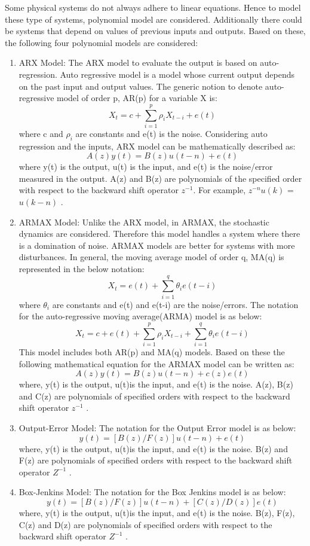 \documentclass[article,type=msc,colorback,12pt,accentcolor=tud8b,table]{tudthesis}
\begin{document}
	Some physical systems do not always adhere to linear equations. Hence to model these type of systems, polynomial model are considered. Additionally there could be systems that depend on values of previous inputs and outputs. Based on these, the following four polynomial models are considered\cite{ljung1998system, ljung1999system}:
	
	\begin{enumerate}
		\item{ARX Model:} The ARX model to evaluate the output is based on auto-regression. Auto regressive model is a model whose current output depends on the past input and output values. The generic notion to denote auto-regressive model of order p, AR(p) for a variable X is: $$ X_t = c + \sum_{i=1}^{p} \rho_i X_{t-i} + e(t) $$ where c and $ \rho_i $ are constants and e(t) is the noise. Considering auto regression and the inputs, ARX model can be mathematically described as: $$ A(z) y(t) = B(z) u(t-n) + e(t) $$ where y(t) is the output, u(t) is the input, and e(t) is the noise/error measured in the output. A(z) and B(z) are polynomials of the specified order with respect to the backward shift operator $z^{-1}$. For example, $z^{-n}  u(k)$ = $u(k-n)$ \cite{ljung1999system}.
		
	\item{ARMAX Model:} Unlike the ARX model, in ARMAX, the stochastic dynamics are considered. Therefore this model handles a system where there is a domination of noise. ARMAX models are better for systems with more disturbances. In general, the moving average model of order q, MA(q) is represented in the below notation: $$ X_t =  e(t) + \sum_{i=1}^{q} \theta_i e(t-i) $$ where $ \theta_i $ are constants and e(t) and e(t-i) are the noise/errors. The notation for the auto-regressive moving average(ARMA) model is as below: $$ X_t = c + e(t) + \sum_{i=1}^{p} \rho_i X_{t-i} + \sum_{i=1}^{q} \theta_i e(t-i) $$ This model includes both AR(p) and MA(q) models. Based on these the following mathematical equation for the ARMAX model can be written as: $$ A(z) y(t) = B(z) u(t-n) + c(z) e(t) $$ where, y(t) is the output, u(t)is the input, and e(t) is the noise. A(z), B(z) and C(z) are polynomials of specified orders with respect to the backward shift operator $z^{-1}$ \cite{ljung1999system}. 
	
	\item{Output-Error Model:} 
		The notation for the Output Error model is as below: $$ y(t) = [B(z)/F(z)] u(t-n) + e(t) $$ where, y(t) is the output, u(t)is the input, and e(t) is the noise. B(z) and F(z) are polynomials of specified orders with respect to the backward shift operator $Z^{-1}$ \cite{ljung1999system}.
	
	\item{Box-Jenkins Model:} 	
		 The notation for the Box Jenkins model is as below: $$ y(t) = [B(z)/F(z)] u(t-n) + [C(z)/D(z)] e(t) $$ where, y(t) is the output, u(t)is the input, and e(t) is the noise. B(z), F(z), C(z) and D(z) are polynomials of specified orders with respect to the backward shift operator $Z^{-1}$ \cite{box2015time}.	 
		 
	\end{enumerate}
	
\end{document}
